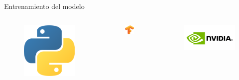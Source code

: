\documentclass[12pt,aspectratio=169]{beamer}
\begin{document}
\begin{frame}{Entrenamiento del modelo}
\begin{columns}[c]
            \begin{figure}[h]
                \includegraphics[scale=0.04]{figs/python}
            \end{figure}
            \vspace*{-4mm}
            \begin{figure}[h]
                \includegraphics[scale=0.3]{figs/tensorflow.png}
            \end{figure}
            \vspace*{-7mm}
            \begin{figure}[h]
                \includegraphics[scale=0.06]{figs/nvidia.png}
            \end{figure}
            
    \end{columns}
\end{frame}
\end{document}
